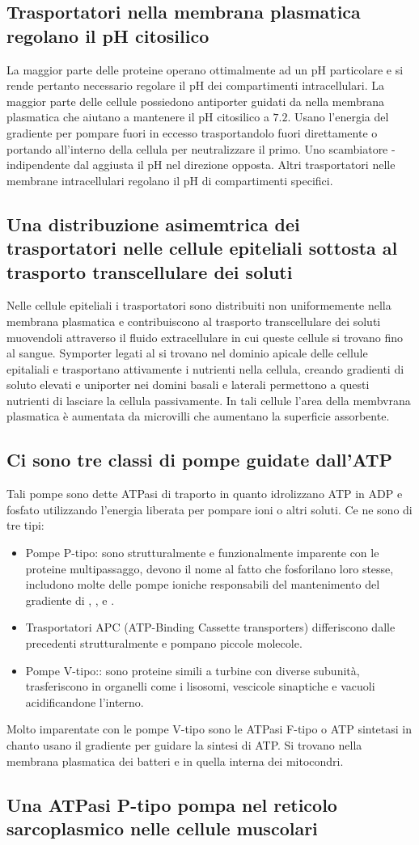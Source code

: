 \subsection{Trasportatori nella membrana plasmatica regolano il pH citosilico}
La maggior parte delle proteine operano ottimalmente ad un pH particolare e si rende pertanto necessario regolare il pH dei compartimenti intracellulari. La maggior parte delle cellule
possiedono antiporter guidati da  nella membrana plasmatica che aiutano a mantenere il pH citosilico a $7.2$. Usano l'energia del gradiente  per pompare fuori  in
eccesso trasportandolo fuori direttamente o portando all'interno della cellula  per neutralizzare il primo. Uno scambiatore - indipendente dal  
aggiusta il pH nel direzione opposta. Altri trasportatori nelle membrane intracellulari regolano il pH di compartimenti specifici.
\subsection{Una distribuzione asimemtrica dei trasportatori nelle cellule epiteliali sottosta al trasporto transcellulare dei soluti}
Nelle cellule epiteliali i trasportatori sono distribuiti non uniformemente nella membrana plasmatica e contribuiscono al trasporto transcellulare dei soluti muovendoli attraverso il 
fluido extracellulare in cui queste cellule si trovano fino al sangue. Symporter legati al  si trovano nel dominio apicale delle cellule epitaliali e trasportano attivamente i 
nutrienti nella cellula, creando gradienti  di soluto elevati e uniporter nei domini basali e laterali permettono a questi nutrienti di lasciare la cellula passivamente. In tali cellule
l'area della membvrana plasmatica \`e aumentata da microvilli che aumentano la superficie assorbente. 
\subsection{Ci sono tre classi di pompe guidate dall'ATP}
Tali pompe sono dette ATPasi di traporto in quanto idrolizzano ATP in ADP e fosfato utilizzando l'energia liberata per pompare ioni o altri soluti. Ce ne sono di tre tipi:
\begin{itemize}
	\item Pompe P-tipo: sono strutturalmente e funzionalmente imparente con le proteine multipassaggo, devono il nome al fatto che fosforilano loro stesse, includono molte delle 
		pompe ioniche responsabili del mantenimento del gradiente di , ,  e .
	\item Trasportatori APC (ATP-Binding Cassette transporters) differiscono dalle precedenti strutturalmente e pompano piccole molecole.
	\item Pompe V-tipo:: sono proteine simili a turbine con diverse subunit\`a, trasferiscono  in organelli come i lisosomi, vescicole sinaptiche e vacuoli acidificandone
		l'interno.
\end{itemize}
Molto imparentate con le pompe V-tipo sono le ATPasi F-tipo o ATP sintetasi in chanto usano il gradiente  per guidare la sintesi di ATP. Si trovano nella membrana plasmatica dei
batteri e in quella interna dei mitocondri. 
\subsection{Una ATPasi P-tipo pompa  nel reticolo sarcoplasmico nelle cellule muscolari}
